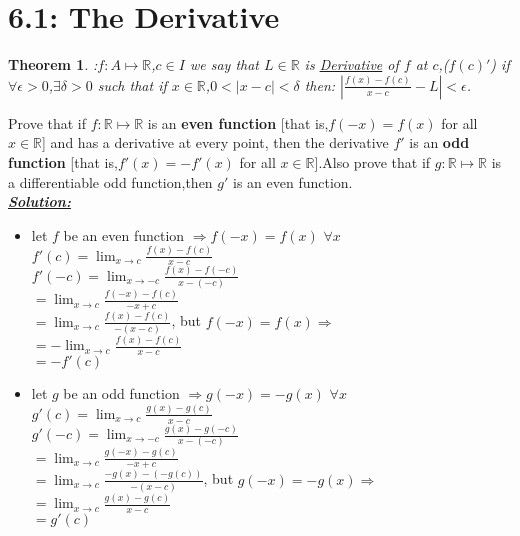 \documentclass[12pt]{article}
\newtheorem{theorem}{Theorem}
\begin{document}
\newpage
\section*{6.1: The Derivative}
\begin{theorem}
:$f\colon A\mapsto\mathbb{R}$,$c\in I$ we say that $L\in\mathbb{R}$ is \underline{Derivative} of $f$ at $c$,(${f(c)}'$) if $\forall\epsilon>0$,${\exists\delta>0}$ such that if $x\in\mathbb{R}$,$0<|x-c|<\delta$ then:
$\left|\frac{f(x)-f(c)}{x-c}-L\right |<\epsilon$.
\end{theorem}
 Prove that if $f\colon\mathbb{R}\mapsto\mathbb{R}$ is an \textbf{even function} [that is,$f(-x)=f(x)$ for all $x\in\mathbb{R}$] and has a derivative at every point, then the derivative ${f}'$ is an \textbf{odd function} [that is,${f}'(x)=-{f}'(x)$ for all $x\in\mathbb{R}$].Also prove that if $g\colon\mathbb{R}\mapsto\mathbb{R}$ is a differentiable odd function,then ${g}'$ is an even function.\\
 \textbf{\underline{\textit{\color{purple}Solution:}}}
 \begin{itemize}
     \item let $f$ be an even function $\Rightarrow f(-x)=f(x)$ $\forall x$\\
${f}'(c)=\lim_{x\to c}\frac{f(x)-f(c)}{x-c}$\\
${f}'(-c)=\lim_{x\to -c}\frac{f(x)-f(-c)}{x-(-c)}$\\
$=\lim_{x\to c}\frac{f(-x)-f(c)}{-x+c}$\\
$=\lim_{x\to c}\frac{f(x)-f(c)}{-(x-c)}$, but $f(-x)=f(x)\Rightarrow$\\
$=-\lim_{x\to c}\frac{f(x)-f(c)}{x-c}$\\
$=-{f}'(c)$
\item let $g$ be an odd function $\Rightarrow g(-x)=-g(x)$ $\forall x$\\
${g}'(c)=\lim_{x\to c}\frac{g(x)-g(c)}{x-c}$\\
${g}'(-c)=\lim_{x\to -c}\frac{g(x)-g(-c)}{x-(-c)}$\\
$=\lim_{x\to c}\frac{g(-x)-g(c)}{-x+c}$\\
$=\lim_{x\to c}\frac{-g(x)-(-g(c))}{-(x-c)}$, but $g(-x)=-g(x)\Rightarrow$\\
$=\lim_{x\to c}\frac{g(x)-g(c)}{x-c}$\\
$={g}'(c)$
 \end{itemize}
 
\newpage
\end{document}
